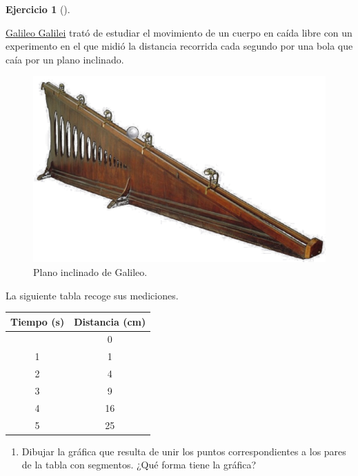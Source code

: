\documentclass[
  a4paper,
]{scrreport}
\theoremstyle{definition}
\newtheorem{exercise}{Ejercicio}[chapter]
\theoremstyle{remark}
\begin{document}
\begin{exercise}[]\protect\hypertarget{exr-tasa-variacion}{}\label{exr-tasa-variacion}

\href{https://en.wikipedia.org/wiki/Galileo_Galilei}{Galileo Galilei}
trató de estudiar el movimiento de un cuerpo en caída libre con un
experimento en el que midió la distancia recorrida cada segundo por una
bola que caía por un plano inclinado.

\begin{figure}[H]

{\centering \includegraphics{img/derivadas/plano-inclinado.png}

}

\caption{Plano inclinado de Galileo.}

\end{figure}%

La siguiente tabla recoge sus mediciones.

\begin{longtable}[]{@{}cc@{}}
\toprule\noalign{}
Tiempo (s) & Distancia (cm) \\
\midrule\noalign{}
\endhead
\bottomrule\noalign{}
\endlastfoot
0 & 0 \\
1 & 1 \\
2 & 4 \\
3 & 9 \\
4 & 16 \\
5 & 25 \\
\end{longtable}

\begin{enumerate}
\def\labelenumi{\alph{enumi}.}
\item
  Dibujar la gráfica que resulta de unir los puntos correspondientes a
  los pares de la tabla con segmentos. ¿Qué forma tiene la gráfica?


\end{enumerate}
\end{exercise}
\end{document}

